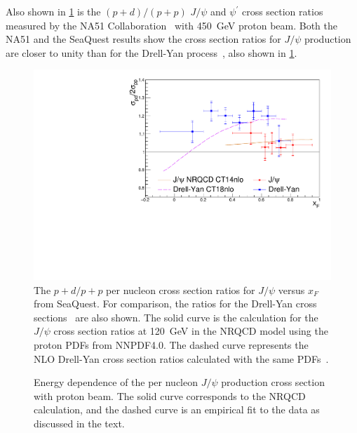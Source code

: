 \documentclass[reprint,aps,unsortedaddress,superscriptaddress,prd,floatfix,showpacs,linenumbers]{revtex4-2}
\begin{document}
Also shown in \cref{fig:pdpp} is the $(p+d)/(p+p)$ $J/\psi$
and $\psi^\prime$ cross section
ratios measured by the NA51 Collaboration~\cite{abreu1998} with \SI{450}{\GeV} proton 
beam. Both the NA51 and the SeaQuest
results show the cross section ratios for $J/\psi$
production are closer to unity than for 
the Drell-Yan process~\cite{dove2023}, also 
shown in \cref{fig:pdpp}. 

\begin{figure}[tb]
\includegraphics*[width=\linewidth]{crossSections/xF/pdpp_xF}
\caption{The $p+d/p+p$ per nucleon cross section ratios for $J/\psi$
versus $x_F$ from SeaQuest.
For comparison, the ratios for the Drell-Yan cross sections~\cite{dove2023} are
also shown. The solid curve is the calculation for the $J/\psi$ cross section
ratios at \SI{120}{\GeV} in the NRQCD model using the proton PDFs from NNPDF4.0.
The dashed curve represents the NLO Drell-Yan cross section ratios
calculated with the same PDFs~\cite{dove2023}.}
\label{fig:pdpp}
\end{figure}

\begin{figure}[tb]
\caption{Energy dependence of the per nucleon $J/\psi$ production
cross section with proton beam. The solid curve corresponds to the NRQCD
calculation, and the dashed curve is an empirical fit to the data
as discussed in the text.}
\label{fig5}
\end{figure}
\end{document}
